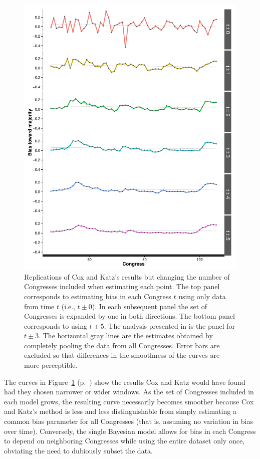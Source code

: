 \begin{figure}
\centering
\includegraphics[scale=0.75]{sections/figs/ck_hypothetical}
\caption{Replications of Cox and Katz's results but changing the number of Congresses 
included when estimating each point. The top panel corresponds to estimating bias in each 
Congress $t$ using only data from time $t$ (i.e., $t \pm 0$). In each subsequent panel the 
set of Congresses is expanded by one in both directions. The bottom panel corresponds to 
using $t \pm 5$. The analysis presented in \protect{} is the 
panel for $t \pm 3$. The horizontal gray lines are the estimates obtained by completely 
pooling the data from all Congresses. Error bars are excluded so that differences in the 
smoothness of the curves are more perceptible.}
\label{fig:ck_hypothetical}
\end{figure}


The curves in Figure~\ref{fig:ck_hypothetical} (p.~\pageref{fig:ck_hypothetical}) show the 
results Cox and Katz would have found had they chosen narrower or wider windows. As the 
set of Congresses included in each model grows, the resulting curve necessarily becomes 
smoother because Cox and Katz's method is less and less distinguishable from simply 
estimating a common bias parameter for all Congresses (that is, assuming no variation in 
bias over time). Conversely, the single Bayesian model allows for bias in each Congress to 
depend on neighboring Congresses while using the entire dataset only once, obviating the 
need to dubiously subset the data. 





